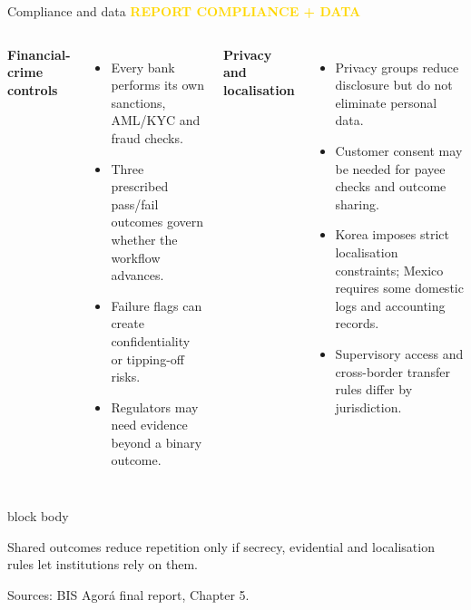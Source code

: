 \documentclass[aspectratio=169,12pt]{beamer}
\newcommand{\rust}[1]{\textcolor{Rust}{\textbf{#1}}}
\newcommand{\blue}[1]{\textcolor{Ocean}{\textbf{#1}}}
\newcommand{\source}[1]{\vfill\par\fontsize{5.4}{6.5}\selectfont\color{Quiet}Sources: #1}
\newcommand{\verytightitems}{\setlength{\itemsep}{0.22em}\setlength{\parskip}{0pt}}
\newcommand{\reporttag}[1]{\textcolor{Gold}{\fontsize{7.2}{8.5}\selectfont\bfseries REPORT #1}}
\newenvironment{statement}{%
  \begin{beamercolorbox}[sep=.18cm,rounded=false,wd=\linewidth]{block body}%
  \fontsize{13}{15.5}\selectfont\bfseries
}{\end{beamercolorbox}}
\begin{document}
\begin{frame}[shrink=35]{Compliance and data}
  \reporttag{COMPLIANCE + DATA}\par\vspace{0.08cm}
  \begin{columns}[T,onlytextwidth]
      \rust{Financial-crime controls}
      \begin{itemize}\verytightitems
        \item Every bank performs its own sanctions, AML/KYC and fraud checks.
        \item Three prescribed pass/fail outcomes govern whether the workflow advances.
        \item Failure flags can create confidentiality or tipping-off risks.
        \item Regulators may need evidence beyond a binary outcome.
      \end{itemize}
      \blue{Privacy and localisation}
      \begin{itemize}\verytightitems
        \item Privacy groups reduce disclosure but do not eliminate personal data.
        \item Customer consent may be needed for payee checks and outcome sharing.
        \item Korea imposes strict localisation constraints; Mexico requires some domestic logs and accounting records.
        \item Supervisory access and cross-border transfer rules differ by jurisdiction.
      \end{itemize}
  \end{columns}
  \begin{statement}
    Shared outcomes reduce repetition only if secrecy, evidential and localisation rules let institutions rely on them.
  \end{statement}
  \source{BIS Agor\'a final report, Chapter 5.}
\end{frame}
\end{document}

